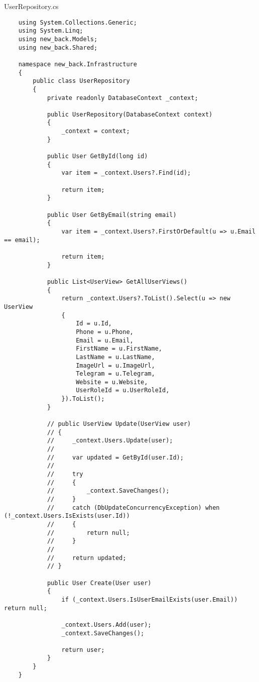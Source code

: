 UserRepository.cs
\lstset{style=sharpc}
\begin{lstlisting}
    using System.Collections.Generic;
    using System.Linq;
    using new_back.Models;
    using new_back.Shared;
    
    namespace new_back.Infrastructure
    {
        public class UserRepository
        {
            private readonly DatabaseContext _context;
            
            public UserRepository(DatabaseContext context)
            {
                _context = context;
            }
            
            public User GetById(long id)
            {
                var item = _context.Users?.Find(id);
    
                return item;
            }
            
            public User GetByEmail(string email)
            {
                var item = _context.Users?.FirstOrDefault(u => u.Email == email);
    
                return item;
            }
            
            public List<UserView> GetAllUserViews()
            {
                return _context.Users?.ToList().Select(u => new UserView
                {
                    Id = u.Id,
                    Phone = u.Phone,
                    Email = u.Email,
                    FirstName = u.FirstName,
                    LastName = u.LastName,
                    ImageUrl = u.ImageUrl,
                    Telegram = u.Telegram,
                    Website = u.Website,
                    UserRoleId = u.UserRoleId,
                }).ToList();
            }
            
            // public UserView Update(UserView user)
            // {
            //     _context.Users.Update(user);
            //
            //     var updated = GetById(user.Id);
            //
            //     try
            //     {
            //         _context.SaveChanges();
            //     }
            //     catch (DbUpdateConcurrencyException) when (!_context.Users.IsExists(user.Id))
            //     {
            //         return null;
            //     }
            //
            //     return updated;
            // }
    
            public User Create(User user)
            {
                if (_context.Users.IsUserEmailExists(user.Email)) return null;
                
                _context.Users.Add(user);
                _context.SaveChanges();
    
                return user;
            }
        }
    }
\end{lstlisting}

